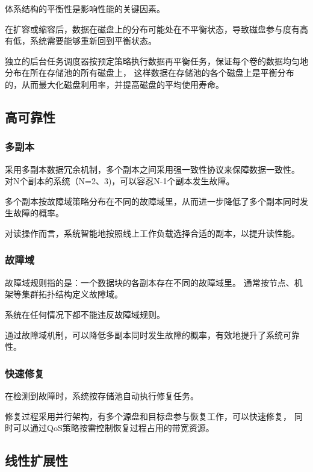 体系结构的平衡性是影响性能的关键因素。

在扩容或缩容后，数据在磁盘上的分布可能处在不平衡状态，导致磁盘参与度有高有低，系统需要能够重新回到平衡状态。

独立的后台任务调度器按预定策略执行数据再平衡任务，保证每个卷的数据均匀地分布在所在存储池的所有磁盘上，
这样数据在存储池的各个磁盘上是平衡分布的，从而最大化磁盘利用率，并提高磁盘的平均使用寿命。

\subsection{高可靠性}

\subsubsection{多副本}

采用多副本数据冗余机制，多个副本之间采用强一致性协议来保障数据一致性。
对N个副本的系统（N=2、3)，可以容忍N-1个副本发生故障。

多个副本按故障域策略分布在不同的故障域里，从而进一步降低了多个副本同时发生故障的概率。

对读操作而言，系统智能地按照线上工作负载选择合适的副本，以提升读性能。

\subsubsection{故障域}

故障域规则指的是：一个数据块的各副本存在不同的故障域里。
通常按节点、机架等集群拓扑结构定义故障域。

系统在任何情况下都不能违反故障域规则。

通过故障域机制，可以降低多副本同时发生故障的概率，有效地提升了系统可靠性。

\subsubsection{快速修复}

在检测到故障时，系统按存储池自动执行修复任务。

修复过程采用并行架构，有多个源盘和目标盘参与恢复工作，可以快速修复，
同时可以通过QoS策略按需控制恢复过程占用的带宽资源。

\subsection{线性扩展性}
